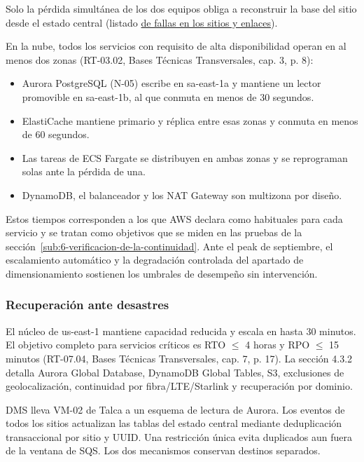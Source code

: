 Solo la pérdida simultánea de los dos equipos obliga a reconstruir la base del sitio desde el estado central (listado \hyperref[tab:fallas-sitios]{de fallas en los sitios y enlaces}).

En la nube, todos los servicios con requisito de alta disponibilidad operan en al menos dos zonas (RT-03.02, Bases Técnicas Transversales, cap. 3, p. 8):

\begin{itemize}
  \item Aurora PostgreSQL (N-05) escribe en sa-east-1a y mantiene un lector promovible en sa-east-1b, al que conmuta en menos de 30 segundos.
  \item ElastiCache mantiene primario y réplica entre esas zonas y conmuta en menos de 60 segundos.
  \item Las tareas de ECS Fargate se distribuyen en ambas zonas y se reprograman solas ante la pérdida de una.
  \item DynamoDB, el balanceador y los NAT Gateway son multizona por diseño.
\end{itemize}

Estos tiempos corresponden a los que AWS declara como habituales para cada servicio y se tratan como objetivos que se miden en las pruebas de la sección~\ref{sub:6-verificacion-de-la-continuidad}. Ante el peak de septiembre, el escalamiento automático y la degradación controlada del apartado de dimensionamiento sostienen los umbrales de desempeño sin intervención.

\subsubsection{Recuperación ante desastres}
\label{sub:4-recuperacion-ante-desastres-ba-art-20-rt}

El núcleo de us-east-1 mantiene capacidad reducida y escala en hasta 30 minutos. El objetivo completo para servicios críticos es RTO $\leq$ 4 horas y RPO $\leq$ 15 minutos (RT-07.04, Bases Técnicas Transversales, cap. 7, p. 17). La sección 4.3.2 detalla Aurora Global Database, DynamoDB Global Tables, S3, exclusiones de geolocalización, continuidad por fibra/LTE/Starlink y recuperación por dominio.

DMS lleva VM-02 de Talca a un esquema de lectura de Aurora. Los eventos de todos los sitios actualizan las tablas del estado central mediante deduplicación transaccional por sitio y UUID. Una restricción única evita duplicados aun fuera de la ventana de SQS. Los dos mecanismos conservan destinos separados.

